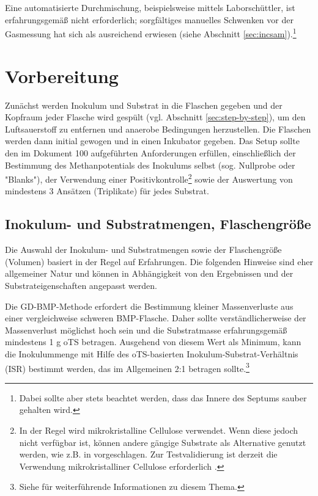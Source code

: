 \documentclass[]{article}
\begin{document}
Eine automatisierte Durchmischung, beispielsweise mittels Laborschüttler, ist erfahrungsgemäß nicht erforderlich; sorgfältiges manuelles Schwenken vor der Gasmessung hat sich als ausreichend erwiesen (siehe Abschnitt \ref{sec:incsam}).\footnote{Dabei sollte aber stets beachtet werden, dass das Innere des Septums sauber gehalten wird.}

\section{Vorbereitung}
\label{sec:setup}
Zunächst werden Inokulum und Substrat in die Flaschen gegeben und der Kopfraum jeder Flasche wird gespült (vgl. Abschnitt \ref{sec:step-by-step}), um den Luftsauerstoff zu entfernen und anaerobe Bedingungen herzustellen.
Die Flaschen werden dann initial gewogen und in einen Inkubator gegeben.
Das Setup sollte den im Dokument 100 \citep{BMPdoc100req} aufgeführten Anforderungen erfüllen, einschließlich der Bestimmung des Methanpotentials des Inokulums selbst (sog. Nullprobe oder "Blanks"), der Verwendung einer Positivkontrolle\footnote{In der Regel wird mikrokristalline Cellulose verwendet. Wenn diese jedoch nicht verfügbar ist, können andere gängige Substrate als Alternative genutzt werden, wie z.B. in \citet{kochEvaluationCommonSupermarket2020} vorgeschlagen. Zur Testvalidierung ist derzeit die Verwendung mikrokristalliner Cellulose erforderlich \citep{BMPdoc100req}.}
sowie der Auswertung von mindestens 3 Ansätzen (Triplikate) für jedes Substrat.

\subsection{Inokulum- und Substratmengen,  Flaschengröße}
\label{sec:quantities}
Die Auswahl der Inokulum- und Substratmengen sowie der Flaschengröße (Volumen) basiert in der Regel auf Erfahrungen.
Die folgenden Hinweise sind eher allgemeiner Natur und können in Abhängigkeit von den Ergebnissen und der Substrateigenschaften angepasst werden.

Die GD-BMP-Methode erfordert die Bestimmung kleiner Massenverluste aus einer vergleichweise schweren BMP-Flasche. Daher sollte verständlicherweise der Massenverlust möglichst hoch sein und die Substratmasse erfahrungsgemäß mindestens 1 g oTS betragen.
Ausgehend von diesem Wert als Minimum, kann die Inokulummenge mit Hilfe des oTS-basierten Inokulum-Substrat-Verhältnis (ISR) bestimmt werden, das im Allgemeinen 2:1 betragen sollte.\footnote{Siehe \citet{holligerStandardizationBiomethanePotential2016} für weiterführende Informationen zu diesem Thema.}
\end{document}
